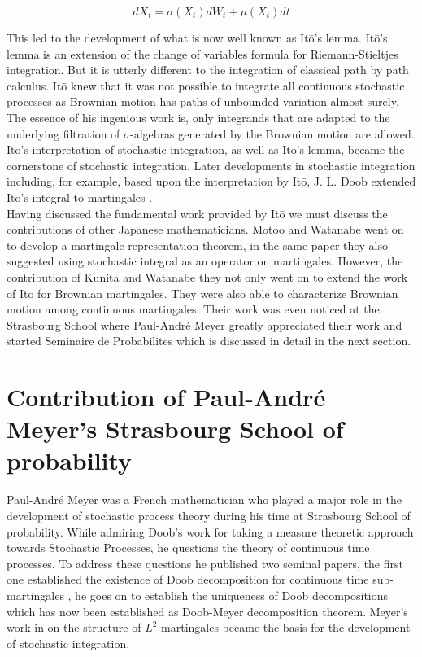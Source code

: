 \documentclass{article}
\begin{document}
\[
dX_t=\sigma(X_t)dW_t + \mu(X_t) dt
\]

This led to the development of what is now well known as It\={o}'s lemma.  It\={o}'s lemma is an extension of the change of variables formula for Riemann-Stieltjes integration. But it is utterly different to the integration of classical path by path calculus. It\={o} knew that it was not possible to integrate all continuous stochastic processes as Brownian motion has paths of unbounded variation almost surely. The essence of his ingenious work is, only integrands that are adapted to the underlying filtration of $\sigma$-algebras generated by the Brownian motion are allowed.  \\

It\={o}’s interpretation of stochastic integration, as well as It\={o}’s lemma, became the cornerstone of stochastic integration. Later developments in stochastic integration including, for example, based upon the interpretation by It\={o}, J. L. Doob extended It\={o}’s integral to martingales \cite{Doob1}. \\

Having discussed the fundamental work provided by It\={o} we must discuss the contributions of other Japanese mathematicians.  Motoo and Watanabe \cite{KW2} went on to develop a martingale representation theorem, in the same paper they also suggested using stochastic integral as an operator on martingales. However, the contribution of Kunita and Watanabe \cite{KW1} they not only went on to extend the work of It\={o} for Brownian martingales.  They were also able to characterize Brownian motion among continuous martingales. Their work was even noticed at the Strasbourg School  where Paul-Andr\'{e} Meyer greatly appreciated their work and started Seminaire de Probabilites which is discussed in detail in the next section. \\

\section{Contribution of Paul-Andr\'{e} Meyer's Strasbourg School of probability
}
Paul-Andr\'{e} Meyer was a French mathematician who played a major role in the development of  stochastic process theory during his time at Strasbourg School of probability. While admiring Doob's work\cite{Doob1} for taking a measure theoretic approach towards Stochastic Processes, he questions the theory of continuous time processes.  To address these questions he published two seminal papers, the first one established the existence of  Doob decomposition for continuous time sub-martingales \cite{Mey6}, he goes on to establish the uniqueness of  Doob decompositions \cite{Mey8} which has now been established as Doob-Meyer decomposition theorem. Meyer's work in \cite{Mey8} on the structure of $L^2$ martingales became the basis for the development of stochastic integration. \\
\end{document}

